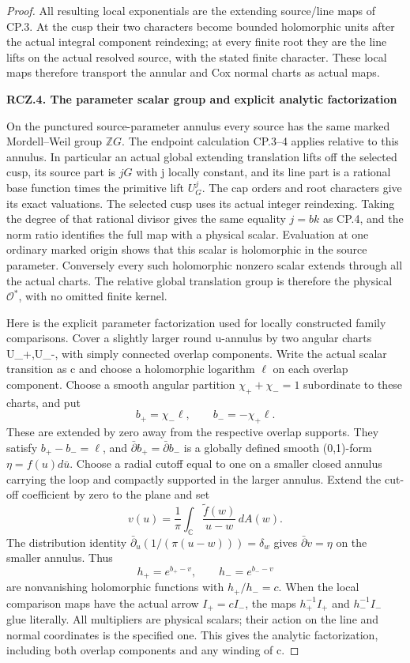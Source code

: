 \begin{proof}
All resulting local exponentials are the extending source/line
maps of CP.3. At the cusp their two characters become bounded
holomorphic units after the actual integral component reindexing;
at every finite root they are the line lifts on the actual
resolved source, with the stated finite character. These local
maps therefore transport the annular and Cox normal charts as
actual maps.

\par

\medskip\noindent\textbf{RCZ.4. The parameter scalar group and explicit analytic factorization}

\par\nobreak

On the punctured source-parameter annulus every source has the
same marked Mordell--Weil group \(\mathbb ZG\). The endpoint
calculation CP.3--4 applies relative to this annulus. In particular
an actual global extending translation lifts off the selected cusp,
its source part is \(jG\) with j locally constant, and its line
part is a rational base function times the primitive lift \(U_G^j\).
The cap orders and root characters give its exact valuations.
The selected cusp uses its actual integer reindexing. Taking the
degree of that rational divisor gives the same equality
\(j=bk\) as CP.4, and the norm ratio identifies the full map
with a physical scalar. Evaluation at one ordinary marked origin
shows that this scalar is holomorphic in the source parameter.
Conversely every such holomorphic nonzero scalar extends through
all the actual charts. The relative global translation group is
therefore the physical \(\mathcal O^*\), with no omitted finite
kernel.

Here is the explicit parameter factorization used for locally
constructed family comparisons. Cover a slightly larger round
u-annulus by two angular charts U\_+,U\_-, with simply connected
overlap components. Write the actual scalar transition as c and
choose a holomorphic logarithm \(\ell\) on each overlap
component. Choose a smooth angular partition \(\chi_++\chi_-=1\)
subordinate to these charts, and put
\[
 b_+=\chi_-\ell,\qquad b_-=-\chi_+\ell.
\]
These are extended by zero away from the respective overlap
supports. They satisfy \(b_+-b_-=\ell\), and
\(\bar\partial b_+=\bar\partial b_-\) is a globally defined
smooth (0,1)-form \(\eta=f(u)d\bar u\). Choose a radial cutoff
equal to one on a smaller closed annulus carrying the loop and
compactly supported in the larger annulus. Extend the cut-off
coefficient by zero to the plane and set
\[
 v(u)=\frac1\pi\int_{\mathbb C}
             \frac{\widetilde f(w)}{u-w}\,dA(w).
\]
The distribution identity
\(\bar\partial_u(1/(\pi(u-w)))=\delta_w\) gives
\(\bar\partial v=\eta\) on the smaller annulus. Thus
\[
 h_+=e^{b_+-v},\qquad h_-=e^{b_--v}
\]
are nonvanishing holomorphic functions with \(h_+/h_-=c\).
When the local comparison maps have the actual arrow
\(I_+=cI_-\), the maps \(h_+^{-1}I_+\) and
\(h_-^{-1}I_-\) glue literally. All multipliers are physical
scalars; their action on the line and normal coordinates is the
specified one. This gives the analytic factorization, including
both overlap components and any winding of c.


\end{proof}
